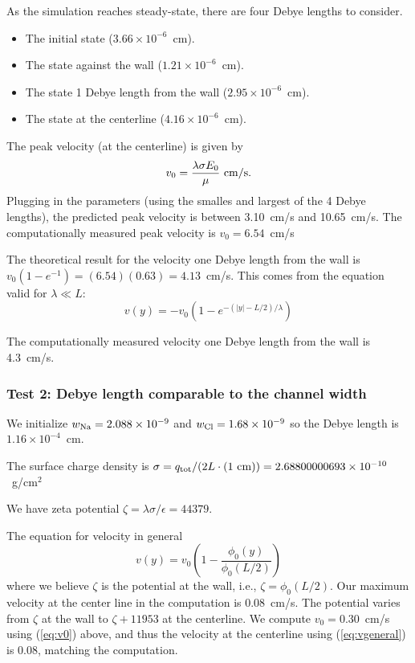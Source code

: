 \documentclass[final]{siamltex}
\begin{document}
As the simulation reaches
steady-state, there are four Debye lengths to consider.
\begin{itemize}
\item The initial state ($3.66\times 10^{-6}$~cm).
\item The state against the wall ($1.21\times 10^{-6}$~cm).
\item The state 1 Debye length from the wall ($2.95\times 10^{-6}$~cm).
\item The state at the centerline ($4.16\times 10^{-6}$~cm).
\end{itemize}
The peak velocity (at the centerline) is given by
\begin{equation}
v_0 = \frac{\lambda\sigma E_0}{\mu} ~ {\rm cm/s}.\label{eq:v0}
\end{equation}
Plugging in the parameters (using the smalles and largest of the 4 Debye lengths),
the predicted peak velocity is between 
3.10~cm/s and 10.65~cm/s.  The computationally measured peak velocity 
is $v_0 = 6.54$~cm/s

The theoretical result for the velocity one Debye length from the wall
is $v_0 (1-e^{-1}) = (6.54)(0.63) = 4.13$~cm/s.
This comes from the equation valid for $\lambda \ll L$:
\begin{equation}
v(y) = -v_0(1-e^{-(|y|-L/2)/\lambda})
\end{equation}

The computationally measured velocity one Debye length from the wall is 4.3~cm/s.  



\subsubsection{Test 2: Debye length comparable to the channel width}
We initialize $w_{\rm Na} = 2.088\times 10^{-9}$ and
$w_{\rm Cl} = 1.68\times 10^{-9}$ so the Debye length is
$1.16\times 10^{-4}$~cm.

The surface charge density
is $\sigma = q_{\rm tot} / (2L\cdot (1~{\rm cm})) = 2.68800000693\times 10^{-10}$~g/cm$^2$

We have zeta potential $\zeta = \lambda\sigma/\epsilon = 44379$.

The equation for velocity in general 
\begin{equation}
v(y) = v_0\left(1 - \frac{\phi_0(y)}{\phi_0(L/2)}\right)\label{eq:vgeneral}
\end{equation}
where we believe $\zeta$ is the potential at the wall, i.e., $\zeta=\phi_0(L/2)$.
Our maximum velocity at the center line in the computation is 0.08~cm/s.
The potential varies from $\zeta$ at the wall to $\zeta+11953$ at the centerline.
We compute $v_0=0.30$~cm/s using (\ref{eq:v0}) above, and thus the velocity at the 
centerline using (\ref{eq:vgeneral}) is $0.08$, matching the computation.
\end{document}
